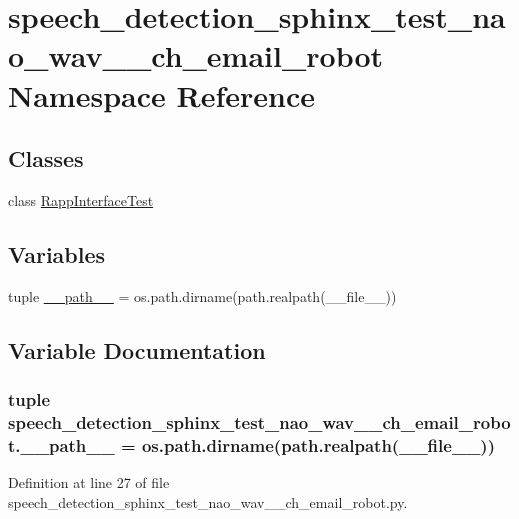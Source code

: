 \hypertarget{namespacespeech__detection__sphinx__test__nao__wav__1__ch__email__robot}{\section{speech\-\_\-detection\-\_\-sphinx\-\_\-test\-\_\-nao\-\_\-wav\-\_\-\_\-ch\-\_\-email\-\_\-robot Namespace Reference}
\label{namespacespeech__detection__sphinx__test__nao__wav__1__ch__email__robot}
}
\subsection*{Classes}
\begin{DoxyCompactItemize}
\item 
class \hyperlink{classspeech__detection__sphinx__test__nao__wav__1__ch__email__robot_1_1RappInterfaceTest}{Rapp\-Interface\-Test}
\end{DoxyCompactItemize}
\subsection*{Variables}
\begin{DoxyCompactItemize}
\item 
tuple \hyperlink{namespacespeech__detection__sphinx__test__nao__wav__1__ch__email__robot_ad99d97f299227c118dc9a3ffedd279dd}{\-\_\-\-\_\-path\-\_\-\-\_\-} = os.\-path.\-dirname(path.\-realpath(\-\_\-\-\_\-file\-\_\-\-\_\-))
\end{DoxyCompactItemize}


\subsection{Variable Documentation}
\hypertarget{namespacespeech__detection__sphinx__test__nao__wav__1__ch__email__robot_ad99d97f299227c118dc9a3ffedd279dd}{
\subsubsection[{\-\_\-\-\_\-path\-\_\-\-\_\-}]{\setlength{\rightskip}{0pt plus 5cm}tuple speech\-\_\-detection\-\_\-sphinx\-\_\-test\-\_\-nao\-\_\-wav\-\_\-\_\-ch\-\_\-email\-\_\-robot.\-\_\-\-\_\-path\-\_\-\-\_\- = os.\-path.\-dirname(path.\-realpath(\-\_\-\-\_\-file\-\_\-\-\_\-))}}\label{namespacespeech__detection__sphinx__test__nao__wav__1__ch__email__robot_ad99d97f299227c118dc9a3ffedd279dd}


Definition at line 27 of file speech\-\_\-detection\-\_\-sphinx\-\_\-test\-\_\-nao\-\_\-wav\-\_\-\_\-ch\-\_\-email\-\_\-robot.\-py.

